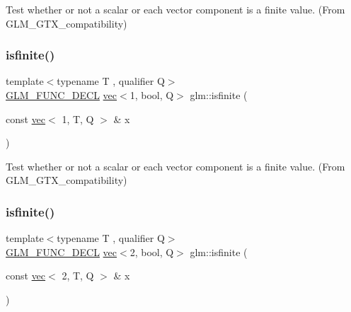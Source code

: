 Test whether or not a scalar or each vector component is a finite value. (From G\+L\+M\+\_\+\+G\+T\+X\+\_\+compatibility) 

\mbox{\label{group__gtx__compatibility_gac3b12b8ac3014418fe53c299478b6603}} 
\subsubsection{\texorpdfstring{isfinite()}{isfinite()}\hspace{0.1cm}{\footnotesize\ttfamily [2/5]}}
{\footnotesize\ttfamily template$<$typename T , qualifier Q$>$ \\
\mbox{\hyperlink{setup_8hpp_ab2d052de21a70539923e9bcbf6e83a51}{G\+L\+M\+\_\+\+F\+U\+N\+C\+\_\+\+D\+E\+CL}} \mbox{\hyperlink{structglm_1_1vec}{vec}}$<$1, bool, Q$>$ glm\+::isfinite (\begin{DoxyParamCaption}\item[{const \mbox{\hyperlink{structglm_1_1vec}{vec}}$<$ 1, T, Q $>$ \&}]{x }\end{DoxyParamCaption})}



Test whether or not a scalar or each vector component is a finite value. (From G\+L\+M\+\_\+\+G\+T\+X\+\_\+compatibility) 

\mbox{\label{group__gtx__compatibility_ga8e76dc3e406ce6a4155c2b12a2e4b084}} 
\subsubsection{\texorpdfstring{isfinite()}{isfinite()}\hspace{0.1cm}{\footnotesize\ttfamily [3/5]}}
{\footnotesize\ttfamily template$<$typename T , qualifier Q$>$ \\
\mbox{\hyperlink{setup_8hpp_ab2d052de21a70539923e9bcbf6e83a51}{G\+L\+M\+\_\+\+F\+U\+N\+C\+\_\+\+D\+E\+CL}} \mbox{\hyperlink{structglm_1_1vec}{vec}}$<$2, bool, Q$>$ glm\+::isfinite (\begin{DoxyParamCaption}\item[{const \mbox{\hyperlink{structglm_1_1vec}{vec}}$<$ 2, T, Q $>$ \&}]{x }\end{DoxyParamCaption})}



